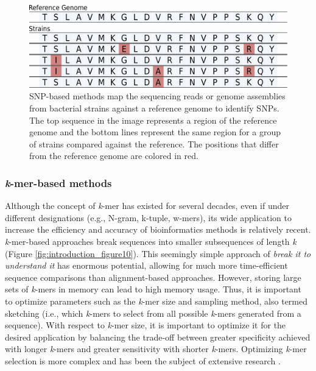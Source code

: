 \begin{figure}[h!]
    \centering
    \includegraphics[angle=0,width=\textwidth]{figures/introduction/Figure9.pdf}
    \caption[SNP-based methods]{SNP-based methods map the sequencing reads or genome assemblies from bacterial strains against a reference genome to identify \acp{SNP}. The top sequence in the image represents a region of the reference genome and the bottom lines represent the same region for a group of strains compared against the reference. The positions that differ from the reference genome are colored in red.}
    \label{fig:introduction_figure9}
\end{figure}

\subsubsection{\textit{k}-mer-based methods}

Although the concept of \textit{k}-mer has existed for several decades, even if under different designations (e.g., N-gram, k-tuple, w-mers), its wide application to increase the efficiency and accuracy of bioinformatics methods is relatively recent. \textit{k}-mer-based approaches break sequences into smaller subsequences of length \textit{k} (Figure \ref{fig:introduction_figure10}). This seemingly simple approach of \textit{break it to understand it} has enormous potential, allowing for much more time-efficient sequence comparisons than alignment-based approaches. However, storing large sets of \textit{k}-mers in memory can lead to high memory usage. Thus, it is important to optimize parameters such as the \textit{k}-mer size and sampling method, also termed sketching (i.e., which \textit{k}-mers to select from all possible \textit{k}-mers generated from a sequence). With respect to \textit{k}-mer size, it is important to optimize it for the desired application by balancing the trade-off between greater specificity achieved with longer \textit{k}-mers and greater sensitivity with shorter \textit{k}-mers. Optimizing \textit{k}-mer selection is more complex and has been the subject of extensive research \cite{roberts_reducing_2004, sahlin_effective_2021, ndiaye_when_2024, karami_designing_2024, kille_minmers_2023, shaw_theory_2022}.

